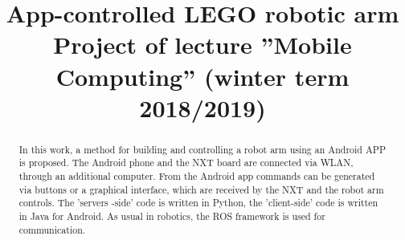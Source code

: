\documentclass[conference]{IEEEtran}
\begin{document}
\title{App-controlled LEGO robotic arm\\
{\footnotesize Project of lecture ''Mobile Computing'' (winter term 2018/2019)}
}

\author{
\and
{}
}

\maketitle

\begin{abstract}
In this work, a method for building and controlling a robot arm using an Android APP is proposed. The Android phone and the NXT board are connected via WLAN, through an additional computer. From the Android app commands can be generated via buttons or a graphical interface, which are received by the NXT and the robot arm controls. The 'servers
-side' code is written in Python, the 'client-side' code is written in Java for Android. As usual in robotics, the ROS framework is used for communication.
\end{abstract}

\end{document}

